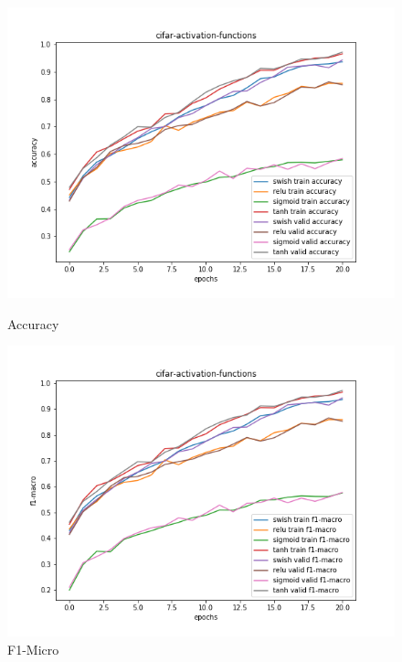 \documentclass{article}
\begin{document}
\begin{figure}[!htb]
	\includegraphics[width=\linewidth]{../output_plots/CIFAR/task-3/cifar-activation-functions-Accuracy-accuracy.png}
	\caption{Accuracy}\label{fig:part_2_task_3_accuracy}
	\endminipage\hfill
	\includegraphics[width=\linewidth]{../output_plots/CIFAR/task-3/cifar-activation-functions-F1-Macro-score-f1-macro.png}
	\caption{F1-Micro}\label{fig:part_2_task_3_f1-micro}
	\endminipage

\end{figure}
\end{document}
